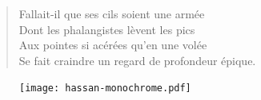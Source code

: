 \begin{verse}
Fallait-il que ses cils soient une armée\\
Dont les phalangistes lèvent les pics\\
Aux pointes si acérées qu’en une volée\\
Se fait craindre un regard de profondeur épique.\\
\end{verse}

\begin{figure}[h]
\centering
\texttt{[image: hassan-monochrome.pdf]}
\captionsetup{labelformat=empty}
\caption[Idéotexte de la tour  (\textarabic{حسان})]{}
\end{figure}

